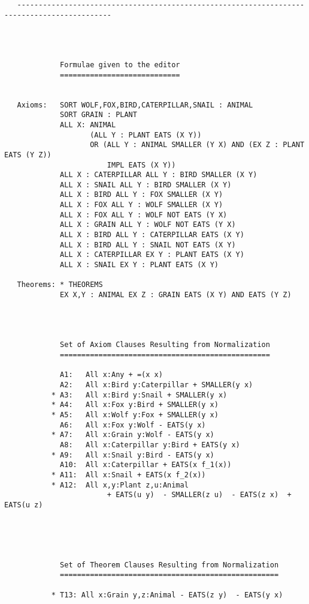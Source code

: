 {\begin{verbatim}
   --------------------------------------------------------------------------------------------




             Formulae given to the editor
             ============================

   
   Axioms:   SORT WOLF,FOX,BIRD,CATERPILLAR,SNAIL : ANIMAL
             SORT GRAIN : PLANT
             ALL X: ANIMAL 
                    (ALL Y : PLANT EATS (X Y))
                    OR (ALL Y : ANIMAL SMALLER (Y X) AND (EX Z : PLANT EATS (Y Z)) 
                        IMPL EATS (X Y))
             ALL X : CATERPILLAR ALL Y : BIRD SMALLER (X Y)
             ALL X : SNAIL ALL Y : BIRD SMALLER (X Y)
             ALL X : BIRD ALL Y : FOX SMALLER (X Y)
             ALL X : FOX ALL Y : WOLF SMALLER (X Y)
             ALL X : FOX ALL Y : WOLF NOT EATS (Y X)
             ALL X : GRAIN ALL Y : WOLF NOT EATS (Y X)
             ALL X : BIRD ALL Y : CATERPILLAR EATS (X Y)
             ALL X : BIRD ALL Y : SNAIL NOT EATS (X Y)
             ALL X : CATERPILLAR EX Y : PLANT EATS (X Y)
             ALL X : SNAIL EX Y : PLANT EATS (X Y)
             
   Theorems: * THEOREMS
             EX X,Y : ANIMAL EX Z : GRAIN EATS (X Y) AND EATS (Y Z)
             
   


             Set of Axiom Clauses Resulting from Normalization
             =================================================

             A1:   All x:Any + =(x x)
             A2:   All x:Bird y:Caterpillar + SMALLER(y x)
           * A3:   All x:Bird y:Snail + SMALLER(y x)
           * A4:   All x:Fox y:Bird + SMALLER(y x)
           * A5:   All x:Wolf y:Fox + SMALLER(y x)
             A6:   All x:Fox y:Wolf - EATS(y x)
           * A7:   All x:Grain y:Wolf - EATS(y x)
             A8:   All x:Caterpillar y:Bird + EATS(y x)
           * A9:   All x:Snail y:Bird - EATS(y x)
             A10:  All x:Caterpillar + EATS(x f_1(x))
           * A11:  All x:Snail + EATS(x f_2(x))
           * A12:  All x,y:Plant z,u:Animal 
                        + EATS(u y)  - SMALLER(z u)  - EATS(z x)  + EATS(u z)
           




             Set of Theorem Clauses Resulting from Normalization
             ===================================================

           * T13: All x:Grain y,z:Animal - EATS(z y)  - EATS(y x)





\end{verbatim}}
